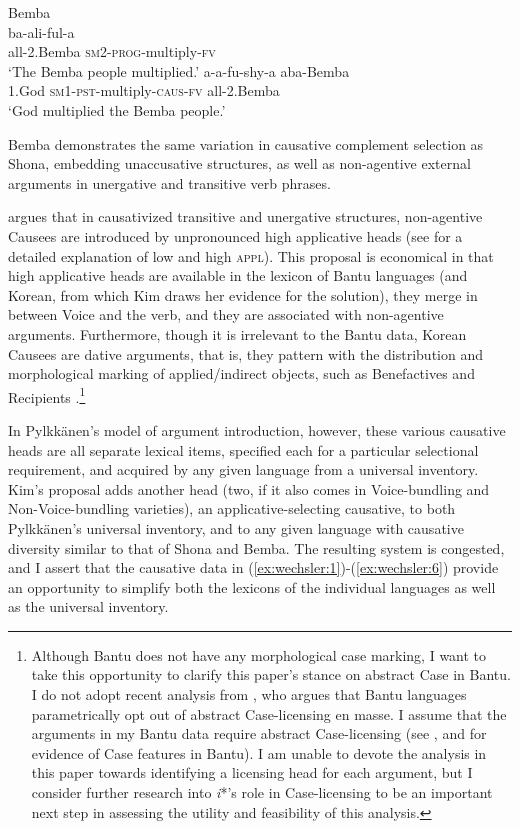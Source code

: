 \documentclass[output=paper,modfonts,nonflat,colorlinks,citecolor=brown]{langsci/langscibook}
\begin{document}
\ea\label{ex:wechsler:6}
Bemba \citep[155]{Givón1969}\\
\ea 
{}  {{ba-ali-ful-a}}  \\
 {all-2.Bemba}   {\textsc{sm2}{}-\textsc{prog}{}-multiply-\textsc{fv}}  \\
\glt `The Bemba people multiplied.'
\ex
{}  {{a-a-fu-shy-a} }  {{aba-Bemba}}\\
 1.God  {\textsc{sm1-pst}{}-multiply-\textsc{caus}{}-\textsc{fv}}  {all-2.Bemba}\\
\glt `God multiplied the Bemba people.'
\z
\z

Bemba demonstrates the same variation in causative complement selection as Shona, embedding unaccusative structures, as well as non-agentive external arguments in unergative and transitive verb phrases. 


\citet{Kim2011thesis} argues that in causativized transitive and unergative structures, non-agentive Causees are introduced by unpronounced high applicative heads (see  for a detailed explanation of low and high \textsc{appl).} This proposal is economical in that high applicative heads are available in the lexicon of Bantu languages (and Korean, from which Kim draws her evidence for the solution), they merge in between Voice and the verb, and they are associated with non-agentive arguments. Furthermore, though it is irrelevant to the Bantu data, Korean Causees are dative arguments, that is, they pattern with the distribution and morphological marking of applied/indirect objects, such as Benefactives and Recipients \citep{Kim2011thesis}.\footnote{{Although Bantu does not have any morphological case marking, I want to take this opportunity to clarify this paper's stance on abstract Case in Bantu. I do not adopt recent analysis from} {\citet{Diercks2012}, who argues that Bantu languages parametrically opt out of abstract Case-licensing en masse. I assume that the arguments in my Bantu data require abstract Case-licensing (see} \citealt{vanderWal2015,SheehanvanderWal2016,Halpert2012}, and \citealt{Wechsler2014,Wechsler2016} for evidence of Case features in Bantu). I am unable to devote the analysis in this paper towards identifying a licensing head for each argument, but I consider further research into \textit{i}*’s role in Case-licensing to be an important next step in assessing the utility and feasibility of this analysis.}


In Pylkkänen’s model of argument introduction, however, these various causative heads are all separate lexical items, specified each for a particular selectional requirement, and acquired by any given language from a universal inventory. Kim’s proposal adds another head (two, if it also comes in Voice-bundling and Non-Voice-bundling varieties), an applicative-selecting causative, to both Pylkkänen’s universal inventory, and to any given language with causative diversity similar to that of Shona and Bemba. The resulting system is congested, and I assert that the causative data in (\ref{ex:wechsler:1})-(\ref{ex:wechsler:6}) provide an opportunity to simplify both the lexicons of the individual languages as well as the universal inventory.
\end{document}
